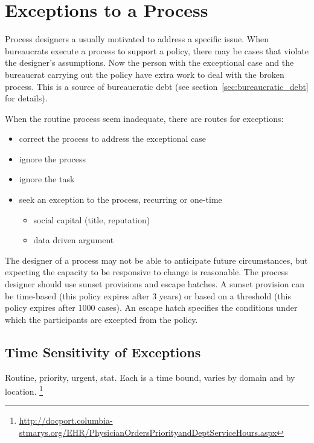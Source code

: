 \section{Exceptions to a Process\label{sec:exceptions-to-process}}


Process designers a usually motivated to address a specific issue. When bureaucrats execute a process to support a policy, there may be cases that violate the designer's assumptions. Now the person with the exceptional case and the bureaucrat carrying out the policy have extra work to deal with the broken process. This is a source of bureaucratic debt (see section~\ref{sec:bureaucratic_debt} for details). 

When the routine process seem inadequate, there are routes for exceptions:
\begin{itemize}
    \item correct the process to address the exceptional case
    \item ignore the process
    \item ignore the task
    \item seek an exception to the process, recurring or one-time
    \begin{itemize}
        \item social capital (title, reputation)
        \item data driven argument 
    \end{itemize}
\end{itemize}

The designer of a process may not be able to anticipate future circumstances, but expecting the capacity to be responsive to change is reasonable. The process designer should use sunset provisions and escape hatches.  
A sunset provision can be time-based (this policy expires after 3 years) or based on a threshold (this policy expires after 1000 cases). An escape hatch specifies the conditions under which the participants are excepted from the policy. 

\subsection*{Time Sensitivity of Exceptions}
Routine, priority, urgent, stat. 
Each is a time bound, varies by domain and by location.
\footnote{\href{http://docport.columbia-stmarys.org/EHR/PhysicianOrdersPriorityandDeptServiceHours.aspx}{http://docport.columbia-stmarys.org/EHR/PhysicianOrdersPriorityandDeptServiceHours.aspx}}